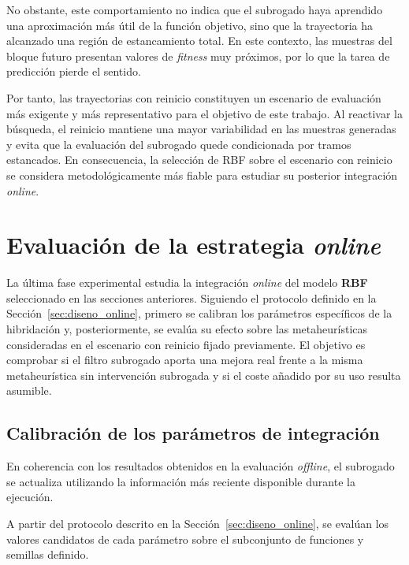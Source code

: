 No obstante, este comportamiento no indica que el subrogado haya aprendido una aproximación más útil de la función objetivo, sino que la trayectoria ha alcanzado una región de estancamiento total. En este contexto, las muestras del bloque futuro presentan valores de \textit{fitness} muy próximos, por lo que la tarea de predicción pierde el sentido.

Por tanto, las trayectorias con reinicio constituyen un escenario de evaluación
más exigente y más representativo para el objetivo de este trabajo. Al reactivar
la búsqueda, el reinicio mantiene una mayor variabilidad en las muestras
generadas y evita que la evaluación del subrogado quede condicionada por tramos estancados. En consecuencia, la selección de RBF sobre el
escenario con reinicio se considera metodológicamente más fiable para estudiar
su posterior integración \textit{online}.


\section{Evaluación de la estrategia \textit{online}}
\label{sec:online}

La última fase experimental estudia la integración \textit{online} del modelo \textbf{RBF} seleccionado en las secciones anteriores. Siguiendo el protocolo definido en la Sección~\ref{sec:diseno_online}, primero se calibran los parámetros específicos de la hibridación y, posteriormente, se evalúa su efecto sobre las metaheurísticas consideradas en el escenario con reinicio fijado previamente. El objetivo es comprobar si el filtro subrogado aporta una mejora real frente a la misma metaheurística sin intervención subrogada y si el coste añadido por su
uso resulta asumible.

\subsection{Calibración de los parámetros de integración}


En coherencia con los resultados obtenidos en la evaluación \textit{offline}, el subrogado se actualiza utilizando la
información más reciente disponible durante la ejecución.

A partir del protocolo descrito en la Sección~\ref{sec:diseno_online}, se evalúan los valores candidatos de cada parámetro sobre el subconjunto de funciones y semillas definido.


